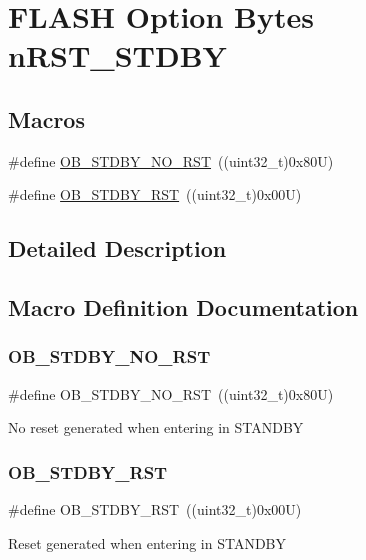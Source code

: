 \hypertarget{group___f_l_a_s_h_ex___option___bytes__n_r_s_t___s_t_d_b_y}{}\section{F\+L\+A\+SH Option Bytes n\+R\+S\+T\+\_\+\+S\+T\+D\+BY}
\label{group___f_l_a_s_h_ex___option___bytes__n_r_s_t___s_t_d_b_y}
\subsection*{Macros}
\begin{DoxyCompactItemize}
\item 
\#define \mbox{\hyperlink{group___f_l_a_s_h_ex___option___bytes__n_r_s_t___s_t_d_b_y_gad776ed7b3b9a98013aac9976eedb7e94}{O\+B\+\_\+\+S\+T\+D\+B\+Y\+\_\+\+N\+O\+\_\+\+R\+ST}}~((uint32\+\_\+t)0x80\+U)
\item 
\#define \mbox{\hyperlink{group___f_l_a_s_h_ex___option___bytes__n_r_s_t___s_t_d_b_y_ga69451a6f69247528f58735c9c83499ce}{O\+B\+\_\+\+S\+T\+D\+B\+Y\+\_\+\+R\+ST}}~((uint32\+\_\+t)0x00\+U)
\end{DoxyCompactItemize}


\subsection{Detailed Description}


\subsection{Macro Definition Documentation}
\mbox{\label{group___f_l_a_s_h_ex___option___bytes__n_r_s_t___s_t_d_b_y_gad776ed7b3b9a98013aac9976eedb7e94}} 
\subsubsection{\texorpdfstring{OB\_STDBY\_NO\_RST}{OB\_STDBY\_NO\_RST}}
{\footnotesize\ttfamily \#define O\+B\+\_\+\+S\+T\+D\+B\+Y\+\_\+\+N\+O\+\_\+\+R\+ST~((uint32\+\_\+t)0x80\+U)}

No reset generated when entering in S\+T\+A\+N\+D\+BY \mbox{\label{group___f_l_a_s_h_ex___option___bytes__n_r_s_t___s_t_d_b_y_ga69451a6f69247528f58735c9c83499ce}} 
\subsubsection{\texorpdfstring{OB\_STDBY\_RST}{OB\_STDBY\_RST}}
{\footnotesize\ttfamily \#define O\+B\+\_\+\+S\+T\+D\+B\+Y\+\_\+\+R\+ST~((uint32\+\_\+t)0x00\+U)}

Reset generated when entering in S\+T\+A\+N\+D\+BY 